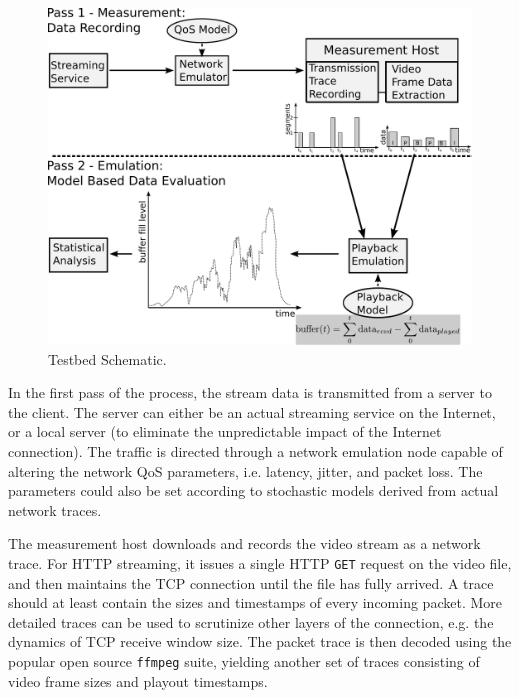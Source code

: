  
\begin{figure}[htb]
	\includegraphics[width=\textwidth]{images/measurement-model.pdf}
	\caption{Testbed Schematic.}
	\label{c3:fig:testbed}
\end{figure}

In the first pass of the process, the stream data is transmitted from a server to the client. The server can either be an actual streaming service on the Internet, or a local server (to eliminate the unpredictable impact of the Internet connection). The traffic is directed through a network emulation node capable of altering the network QoS parameters, i.e. latency, jitter, and packet loss. The parameters could also be set according to stochastic models derived from actual network traces. 

The measurement host downloads and records the video stream as a network trace. For HTTP streaming, it issues a single HTTP \texttt{GET} request on the video file, and then maintains the TCP connection until the file has fully arrived. A trace should at least contain the sizes and timestamps of every incoming packet. More detailed traces can be used to scrutinize other layers of the connection, e.g. the dynamics of TCP receive window size. The packet trace is then decoded using the popular open source \texttt{ffmpeg} suite, yielding another set of traces consisting of video frame sizes and playout timestamps.

